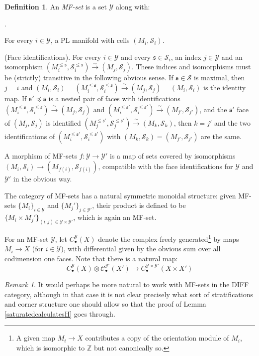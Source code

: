 \documentclass[12pt]{article}
\theoremstyle{definition}
\newtheorem{definition}[theorem]{Definition}
\theoremstyle{remark}
\newtheorem{remark}[theorem]{Remark}
\numberwithin{equation}{subsection}
\newcommand{\C}{\mathcal C}
\newcommand{\s}{\mathfrak s}
\newcommand{\Y}{\mathcal Y}
\newcommand{\ZZ}{\mathbb Z}
\newcommand{\SSS}{\mathcal S}
\newcounter{rcounti}
\newenvironment{rlist}{\begin{list}{\roman{rcounti}.}{\usecounter{rcounti}
\setlength\itemsep{0pt}
\setlength\labelsep{4pt}
\setlength\labelwidth{16pt}
\setlength\leftmargin{32pt}
\setlength\listparindent{0pt}
\setlength\parsep{0pt}
\setlength\parskip{0pt}
\setlength\partopsep{0pt}
\setlength\rightmargin{0pt}
\setlength\topsep{0pt}
\setlength\itemindent{0pt}
}}{\end{list}}
\begin{document}
\begin{definition}
An \emph{MF-set} is a set $\Y$ along with:
\begin{rlist}
\item For every $i\in\Y$, a PL manifold with cells $(M_i,\SSS_i)$.
\item(Face identifications). For every $i\in\Y$ and every $\s\in\SSS_i$, an index $j\in\Y$ and an isomorphism $(M_i^{\leq\s},\SSS_i^{\leq\s})\xrightarrow\sim(M_j,\SSS_j)$.  These indices and isomorphisms must be (strictly) transitive in the following obvious sense.  If $\s\in\SSS$ is maximal, then $j=i$ and $(M_i,\SSS_i)=(M_i^{\leq\s},\SSS_i^{\leq\s})\xrightarrow\sim(M_j,\SSS_j)=(M_i,\SSS_i)$ is the identity map.  If $\s'\preceq\s$ is a nested pair of faces with identifications $(M_i^{\leq\s},\SSS_i^{\leq\s})\xrightarrow\sim(M_j,\SSS_j)$ and $(M_i^{\leq\s'},\SSS_i^{\leq\s'})\xrightarrow\sim(M_{j'},\SSS_{j'})$, and the $\s'$ face of $(M_j,\SSS_j)$ is identified $(M_j^{\leq\s'},\SSS_j^{\leq\s'})\xrightarrow\sim(M_k,\SSS_k)$, then $k=j'$ and the two identifications of $(M_i^{\leq\s'},\SSS_i^{\leq\s'})$ with $(M_k,\SSS_k)=(M_{j'},\SSS_{j'})$ are the same.
\end{rlist}
A morphism of MF-sets $f:\Y\to\Y'$ is a map of sets covered by isomorphisms $(M_i,\SSS_i)\to(M_{f(i)},\SSS_{f(i)})$, compatible with the face identifications for $\Y$ and $\Y'$ in the obvious way.

The category of MF-sets has a natural symmetric monoidal structure: given MF-sets $\{M_i\}_{i\in\Y}$ and $\{M_j'\}_{j\in\Y'}$, their product is defined to be $\{M_i\times M_j'\}_{(i,j)\in\Y\times\Y'}$, which is again an MF-set.

For an MF-set $\Y$, let $C^\Y_\bullet(X)$ denote the complex freely generated\footnote{A given map $M_i\to X$ contributes a copy of the orientation module of $M_i$, which is isomorphic to $\ZZ$ but not canonically so.} by maps $M_i\to X$ (for $i\in\Y$), with differential given by the obvious sum over all codimension one faces.  Note that there is a natural map:
\begin{equation}
C_\bullet^\Y(X)\otimes\C_\bullet^{\Y'}(X')\to C_\bullet^{\Y\times\Y'}(X\times X')
\end{equation}
\end{definition}

\begin{remark}
It would perhaps be more natural to work with MF-sets in the DIFF category, although in that case it is not clear precisely what sort of stratifications and corner structure one should allow so that the proof of Lemma \ref{saturatedcalculatesH} goes through.
\end{remark}
\end{document}
